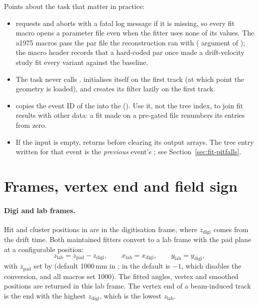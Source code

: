 Points about the task that matter in practice:
\begin{itemize}
\item {} requests  and aborts with a fatal log message if it is missing, so
  every fit macro opens a parameter file even when the fitter uses none of its values. The a1975 macros pass the par
  file the reconstruction ran with ( argument of ); the macro
  header records that a hard-coded par once made a drift-velocity study fit every variant against the baseline.
\item The task never calls .  initialises itself on the first track (at which
  point the geometry is loaded), and  creates its filter lazily on the first track.
\item {} copies the event ID of the  into the 
  (). Use it, not the tree index, to join fit results with other data: a fit made on a pre-gated
  file renumbers its entries from zero.
\item If the input  is empty,  returns before clearing its output arrays. The tree
  entry written for that event is the \emph{previous} event's ; see
  Section~\ref{sec:fit-pitfalls}.
\end{itemize}

\section{Frames, vertex end and field sign}
\label{sec:fit-frames}

\paragraph{Digi and lab frames.} Hit and cluster positions in  are in the digitisation frame, where
$z_\mathrm{digi}$ comes from the drift time. Both maintained fitters convert to a lab frame with the pad plane at a
configurable position:
\[
  z_\mathrm{lab} = z_\mathrm{pad} - z_\mathrm{digi},\qquad x_\mathrm{lab}=x_\mathrm{digi},\qquad
  y_\mathrm{lab}=y_\mathrm{digi},
\]
with $z_\mathrm{pad}$ set by  (default 1000\,mm in ; in  the
default is $-1$, which disables the conversion, and all macros set 1000). The fitted angles, vertex and smoothed
positions are returned in this lab frame. The vertex end of a beam-induced track is the end with the highest
$z_\mathrm{digi}$, which is the lowest $z_\mathrm{lab}$.

